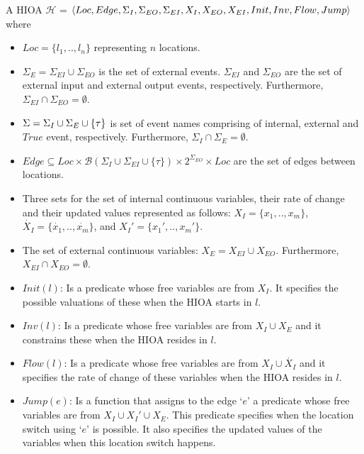 \begin{definition}
  A \acf{HIOA} \newline $\mathcal{H}$ =
  $\langle Loc, Edge, \Sigma_I, \Sigma_{EO}, \Sigma_{EI}, X_I, X_{EO},
  X_{EI}, \linebreak Init, Inv, Flow, Jump\rangle$ where
  \begin{itemize}
  \item $Loc=\{l_1,..,l_n\}$ representing $n$ locations.
  \item $\Sigma_{E} = \Sigma_{EI} \cup \Sigma_{EO}$ is the set of
    external events. $\Sigma_{EI}$ and $\Sigma_{EO}$ are the set of
    external input and external output events,
    respectively. Furthermore,
    \mbox{$\Sigma_{EI} \cap \Sigma_{EO} = \emptyset$}.
  \item $\Sigma=\Sigma_I \cup \Sigma_{E} \cup \{\tau\}$ is set of
    event names comprising of internal, external and $True$ event,
    respectively. Furthermore,
    \mbox{$\Sigma_I \cap \Sigma_E = \emptyset$}.
  \item
    $Edge \subseteq Loc \times \mathcal{B}(\Sigma_I \cup \Sigma_{EI}
    \cup \{\tau\}) \times 2^{\Sigma_{EO}} \times Loc$
    are the set of edges between locations.
  \item Three sets for the set of internal continuous variables, their
    rate of change and their updated values represented as follows:
    $X_I=\{x_1,.., x_m\}$, $\dot{X_I}=\{\dot{x_1},.., \dot{x_m}\}$, and
    $X_I'=\{x_{1}',.., x_{m}'\}$.
  \item The set of external continuous variables:
    \mbox{$X_E = X_{EI} \cup X_{EO}$}. Furthermore,
    \mbox{$X_{EI} \cap X_{EO} = \emptyset$}.
  \item $Init(l)$: Is a predicate whose free variables are from
    $X_{I}$. It specifies the possible valuations of these when the HIOA
    starts in $l$.
  \item $Inv(l)$: Is a predicate whose free variables are from
    \mbox{$X_I \cup X_{E}$} and it constrains these when the HIOA
    resides in $l$.
  \item $Flow(l)$: Is a predicate whose free variables are from
    $X_I \cup \dot{X_I}$ and it specifies the rate of change of these
    variables when the HIOA resides in $l$.
  \item $Jump(e)$: Is a function that assigns to the edge `$e$' a
    predicate whose free variables are from $X_I \cup X_I' \cup X_E$.
    This predicate specifies when the location switch using `$e$' is
    possible. It also specifies the updated values of the variables when
    this location switch happens.
  \end{itemize}
  \label{def:ha}
\end{definition}

